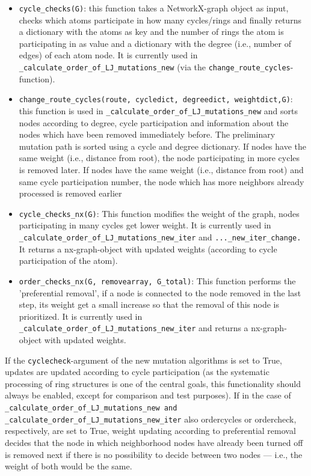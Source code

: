 \begin{itemize}
\item \texttt{cycle\_checks(G)}: this function takes a NetworkX-graph object as input, checks which atoms participate
in how many cycles/rings and finally returns a dictionary with the atoms as
key and the number of rings the atom is participating in as value
and a dictionary with the degree (i.e., number of edges) of each atom
node. It is currently used in \texttt{\_calculate\_order\_of\_LJ\_mutations\_new}
(via the \texttt{change\_route\_cycles}-function).

\item \texttt{change\_route\_cycles\string(route, cycledict, degreedict, weightdict,G\string)}: this function is used in \texttt{\_calculate\_order\_of\_LJ\_mutations\_new}
and sorts nodes according to degree, cycle participation and information
about the nodes which have been removed immediately before. The preliminary mutation
path is sorted using a cycle and degree dictionary. If nodes have the same
weight (i.e., distance from root), the node participating in more cycles
is removed later. If nodes have the same weight (i.e., distance from root)
and same cycle participation number, the node which has more neighbors
already processed is removed earlier

\item \texttt{cycle\_checks\_nx(G)}: This function modifies the weight of
the graph, nodes participating in many cycles get lower weight. It
is currently used in 
\texttt{\_calculate\_order\_of\_LJ\_mutations\_new\_iter} and \texttt{...\_new\_iter\_change.} It returns a nx-graph-object
with updated weights (according to cycle participation of the atom).

\item \texttt{order\_checks\_nx(G, removearray, G\_total)}: This function
performs the 'preferential removal', if a node is connected to the
node removed in the last step, its weight get a small increase so
that the removal of this node is prioritized. It is currently used
in\texttt{ \_calculate\_order\_of\_LJ\_mutations\_new\_iter} and returns
a nx-graph-object with updated weights.
\end{itemize}

If the \texttt{cyclecheck}-argument of the new mutation algorithms is set to True,
updates are updated according to cycle participation (as the systematic
processing of ring structures is one of the central goals, this functionality
should always be enabled, except for comparison and test purposes).
If in the case of \texttt{\_calculate\_order\_of\_LJ\_mutations\_new
and \_calculate\_order\_of\_LJ\_mutations\_new\_iter} also ordercycles
or ordercheck, respectively, are set to True, weight updating according
to preferential removal decides that the node in which neighborhood
nodes have already been turned off is removed next if there is no
possibility to decide between two nodes --- i.e., the weight of both
would be the same.

